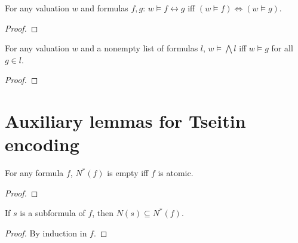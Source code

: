 \begin{lemma}
    \label{Satisfies.iff}
    \leanok
    For any valuation $w$ and formulas $f,g$: $w \models f \leftrightarrow g$ iff $(w \models f) \Leftrightarrow (w \models g)$.
\end{lemma}
\begin{proof}
    \leanok
\end{proof}

\begin{lemma}
    \label{Satisfies.bigAnd}
    \leanok
    For any valuation $w$ and a nonempty list of formulas $l$, $w \models \bigwedge l$ iff $w \models g$ for all $g \in l$.
\end{lemma}
\begin{proof}
    \leanok
\end{proof}


\section{Auxiliary lemmas for Tseitin encoding}

\begin{lemma}
    \label{Ns_eq_empty_iff}
    \leanok
    For any formula $f$, $N^*(f)$ is empty iff $f$ is atomic.
\end{lemma}
\begin{proof}
    \leanok
\end{proof}

\begin{lemma}
    \label{N_sub_subset_Ns}
    \leanok
    If $s$ is a subformula of $f$, then $N(s) \subseteq N^*(f)$.
\end{lemma}
\begin{proof}
    \leanok
    By induction in $f$.
\end{proof}


